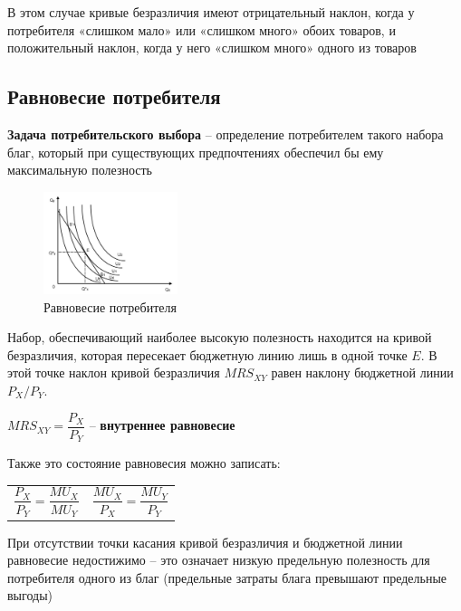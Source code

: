 \documentclass[reqno]{article}
\theoremstyle{definition}
\theoremstyle{definition}
\theoremstyle{definition}
\theoremstyle{definition}
\theoremstyle{definition}
\theoremstyle{definition}
\theoremstyle{definition}
\theoremstyle{definition}
\theoremstyle{definition}
\begin{document}
			\newpage
			В этом случае кривые безразличия имеют отрицательный наклон, когда у потребителя «слишком мало» или «слишком много» обоих товаров, и  положительный наклон, когда у него «слишком много» одного из товаров
			
		\subsection{Равновесие потребителя}	
			
			\textbf{Задача потребительского выбора} -- определение потребителем такого набора благ, который при существующих предпочтениях обеспечил бы ему максимальную полезность
			
			\begin{figure}[h!]
				\centering
				\includegraphics[width=0.35\textwidth]{Равновесие_потребителя}
				\caption{Равновесие потребителя}
			\end{figure}
			
			Набор, обеспечивающий наиболее высокую полезность находится на кривой безразличия, которая пересекает бюджетную линию лишь в одной точке $E$. В этой точке наклон кривой безразличия $MRS_{XY}$ равен наклону бюджетной линии $P_X/P_Y$.
			
			$MRS_{XY} = \dfrac{P_X}{P_Y}$ -- \textbf{внутреннее равновесие}
			
			Также это состояние равновесия можно записать:
			
			\begin{table}[h!]
				\begin{center}
					\begin{tabular}{p{200pt} c}
						$\dfrac{P_X}{P_Y} = \dfrac{MU_X}{MU_Y}$ & $\dfrac{MU_X}{P_X} = \dfrac{MU_Y}{P_Y}$ \\
					\end{tabular}
				\end{center}
			\end{table}
			
			При отсутствии точки касания кривой безразличия и бюджетной линии равновесие недостижимо -- это означает низкую предельную полезность для потребителя одного из благ (предельные затраты блага превышают предельные выгоды)
			
\end{document}
